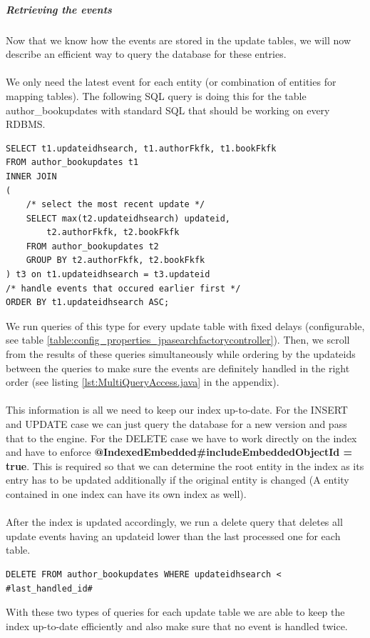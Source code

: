 \pagebreak

\subparagraph{Retrieving the events}
Now that we know how the events are stored in the update tables, we will now describe an efficient way to query the database for these entries.
\\\\
We only need the latest event for each entity (or combination of entities for mapping tables). The following SQL query is doing this for the table author\_bookupdates with standard SQL that should be working on every RDBMS.
\\
\lstset{language=sql}
\begin{lstlisting}[frame=htrbl, caption={Querying for updates (Author\_Book)},
label={lst:querying_updates.sql}]
SELECT t1.updateidhsearch, t1.authorFkfk, t1.bookFkfk
FROM author_bookupdates t1
INNER JOIN
(
	/* select the most recent update */
	SELECT max(t2.updateidhsearch) updateid, 
		t2.authorFkfk, t2.bookFkfk
	FROM author_bookupdates t2
	GROUP BY t2.authorFkfk, t2.bookFkfk
) t3 on t1.updateidhsearch = t3.updateid
/* handle events that occured earlier first */
ORDER BY t1.updateidhsearch ASC;
\end{lstlisting}
\noindent
We run queries of this type for every update table with fixed delays (configurable, see table \ref{table:config_properties_jpasearchfactorycontroller}). Then, we scroll from the results
of these queries simultaneously while ordering by the updateids between the queries to make sure the events are definitely handled in the right order (see listing \ref{lst:MultiQueryAccess.java} in the appendix).
\\\\
This information is all we need to keep our index up-to-date. For the INSERT and UPDATE case we can just query the database for a new version and pass that to the engine. For the DELETE case we have to work directly on the index and have to enforce  \textbf{@IndexedEmbedded\#includeEmbeddedObjectId = true}. This is required so that we can determine the root entity in the index as its entry has to be updated additionally if the original entity is changed (A entity contained in one index can have its own index as well).
\\\\
After the index is updated accordingly, we run a delete query that deletes all update events
having an updateid lower than the last processed one for each table.
\\
\lstset{language=sql}
\begin{lstlisting}[frame=htrbl, caption={Deleting handled updates (Author\_Book)},
label={lst:deleting_updates.sql}]
DELETE FROM author_bookupdates WHERE updateidhsearch < #last_handled_id#
\end{lstlisting}
\noindent
With these two types of queries for each update table we are able to keep the index up-to-date efficiently and also make sure that no event is handled twice.


